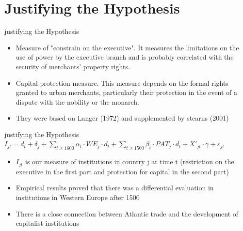 \documentclass[pdftex,12pt,xcolor=pdftex,table]{beamer}
\theoremstyle{definition}
\theoremstyle{remark}
\numberwithin{equation}{section}
\numberwithin{figure}{section}
\begin{document}
	\section{Justifying the Hypothesis}
		\begin{frame}{justifying the Hypothesis}
			\justifying
		    \begin{itemize}
			    \item Measure of "constrain on the executive". It measures the limitations on the use of power by the executive branch and is probably correlated with the security of merchants' property rights.
			    \vspace{4mm} 
			    \item Capital protection measure. This measure depends on the formal rights granted to urban merchants, particularly their protection in the event of a dispute with the nobility or the monarch.
			    \vspace{4mm} 
			    \item They were based on Langer (1972) and supplemented by stearns (2001)
			\end{itemize}
		\end{frame}
		\begin{frame}{justifying the Hypothesis}
			\justifying
		    \centering
		    \textit{$I_{jt} = d_{t} + \delta_{j} + \sum_{t\geq1600} \alpha_{t} \cdot WE_{j} \cdot d_{t} +\sum_{t\geq1500} \beta_t\cdot PAT_j \cdot d_t + X'_{jt}\cdot \gamma + \varepsilon_{jt}$}  
		    \begin{itemize}
			    \item \textit{$I_{jt}$} is our measure of institutions in country j at time t (restriction on the executive in the first part and protection for capital in the second part)
			    \vspace{4mm} 
			    \item Empirical results proved that there was a differential evaluation in institutions in Western Europe after 1500
			    \vspace{4mm} 
			    \item There is a close connection between Atlantic trade and the development of capitalist institutions
			\end{itemize}
		\end{frame}
\end{document}
